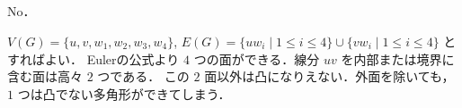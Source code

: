\subsection{}
No．

$V(G) = \{u, v, w_1,w_2,w_3, w_4\}$, $E(G) = \{uw_i\mid 1\leq i\leq 4\}\cup \{vw_i\mid 1\leq i\leq 4\}$ とすればよい．
Eulerの公式より $4$ つの面ができる．線分 $uv$ を内部または境界に含む面は高々 $2$ つである．
この $2$ 面以外は凸になりえない．外面を除いても，$1$ つは凸でない多角形ができてしまう．